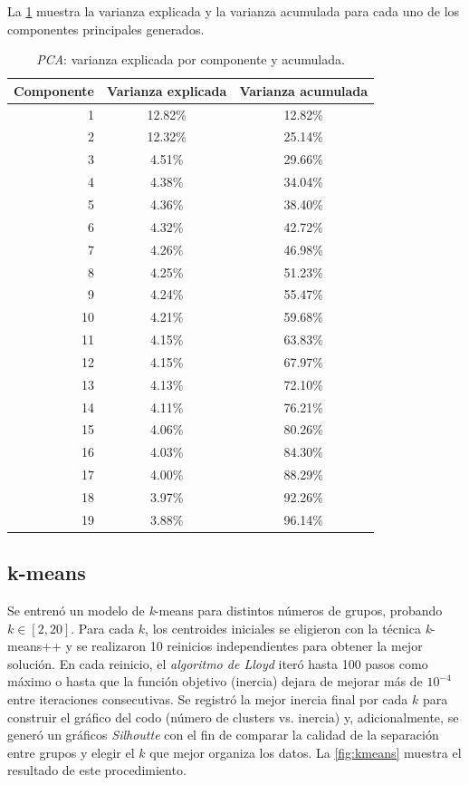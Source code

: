 \documentclass[12pt,a4paper]{article}
\begin{document}
La \cref{tab:pca_varianza} muestra la varianza explicada y la varianza acumulada para cada uno de los componentes 
principales generados.

\begin{table}[ht]
  \centering
  \begin{small}
    \begin{tabular}{rcc}
      \toprule
      \textbf{Componente} & \textbf{Varianza explicada} & \textbf{Varianza acumulada} \\
      \midrule
      1  & 12.82\% & 12.82\% \\
      2  & 12.32\% & 25.14\% \\
      3  & 4.51\%  & 29.66\% \\
      4  & 4.38\%  & 34.04\% \\
      5  & 4.36\%  & 38.40\% \\
      6  & 4.32\%  & 42.72\% \\
      7  & 4.26\%  & 46.98\% \\
      8  & 4.25\%  & 51.23\% \\
      9  & 4.24\%  & 55.47\% \\
      10 & 4.21\%  & 59.68\% \\
      11 & 4.15\%  & 63.83\% \\
      12 & 4.15\%  & 67.97\% \\
      13 & 4.13\%  & 72.10\% \\
      14 & 4.11\%  & 76.21\% \\
      15 & 4.06\%  & 80.26\% \\
      16 & 4.03\%  & 84.30\% \\
      17 & 4.00\%  & 88.29\% \\
      18 & 3.97\%  & 92.26\% \\
      19 & 3.88\%  & 96.14\% \\
      \bottomrule
    \end{tabular}
    \caption{\emph{PCA}: varianza explicada por componente y acumulada.}
    \label{tab:pca_varianza}
  \end{small}
\end{table}

\subsection{k-means}
Se entrenó un modelo de \emph{k}-means para distintos números de grupos, probando \(k\in[2,20]\). Para 
cada \(k\), los centroides iniciales se eligieron con la técnica \emph{k}-means++ y se realizaron 10 reinicios 
independientes para obtener la mejor solución. En cada reinicio, el \emph{algoritmo de Lloyd} 
iteró hasta 100 pasos como máximo o hasta que la función objetivo (inercia) dejara de mejorar más de 
\(10^{-4}\) entre iteraciones consecutivas. Se registró la mejor inercia final por cada \(k\) para 
construir el gráfico del codo (número de clusters vs. inercia) y, adicionalmente, se generó un gráficos 
\emph{Silhoutte} con el fin de comparar la calidad de la separación entre grupos y elegir el \(k\) que 
mejor organiza los datos. La \cref{fig:kmeans} muestra el resultado de este procedimiento.
\end{document}
